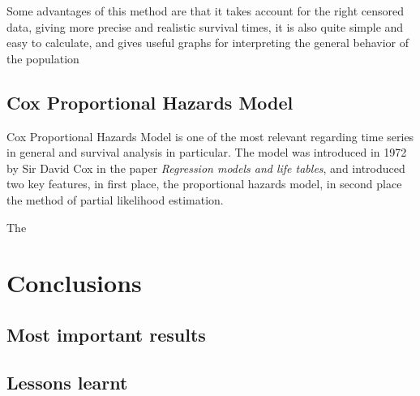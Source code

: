 \documentclass[11pt]{article} %
\begin{document}
    Some advantages of this method are that it takes account for the right censored data, giving more precise and realistic survival times, it is also quite simple and easy to calculate, and gives useful graphs for interpreting the general behavior of the population


  \subsection{Cox Proportional Hazards Model}

    Cox Proportional Hazards Model is one of the most relevant regarding time series in general and survival analysis in particular. The model was introduced in 1972 by Sir David Cox in the paper \emph{Regression models and life tables}, and introduced two key features, in first place, the proportional hazards model, in second place the method of partial likelihood estimation.

    The

\section{Conclusions}
  \label{sec:conclusions}

  \subsection{Most important results}

  \subsection{Lessons learnt}

\newpage
\nocite{*}
\printbibliography
\end{document}
